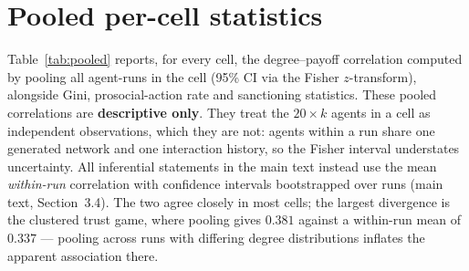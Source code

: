 \documentclass[11pt,a4paper]{article}
\begin{document}
\section{Pooled per-cell statistics}
\label{sec:s9}

Table~\ref{tab:pooled} reports, for every cell, the degree--payoff
correlation computed by pooling all agent-runs in the cell (95\% CI
via the Fisher $z$-transform), alongside Gini, prosocial-action rate and
sanctioning statistics. These pooled correlations are
\textbf{descriptive only}. They treat the $20 \times k$ agents in a
cell as independent observations, which they are not: agents within a
run share one generated network and one interaction history, so the
Fisher interval understates uncertainty. All inferential statements in
the main text instead use the mean \emph{within-run} correlation with
confidence intervals bootstrapped over runs (main text,
Section~3.4). The two agree closely in most cells; the largest
divergence is the clustered trust game, where pooling gives $0.381$
against a within-run mean of $0.337$ --- pooling across runs with
differing degree distributions inflates the apparent association
there.
\end{document}
